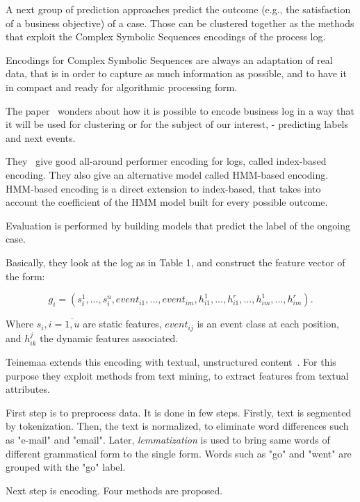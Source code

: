 A next group of prediction approaches predict the outcome (e.g., the satisfaction of a business objective) of a case. Those can be clustered together as the methods that exploit the Complex Symbolic Sequences encodings of the process log.

Encodings for Complex Symbolic Sequences are always an adaptation of real data, that is in order to capture as much information as possible, and to have it in compact and ready for algorithmic processing form. 

The paper~\cite{Leontjeva2015} wonders about how it is possible to encode business log in a way that it will be used for clustering or for the subject of our interest, - predicting labels and next events.

They~\cite{Leontjeva2015} give good all-around performer encoding for logs, called index-based encoding. They also give an alternative model called HMM-based encoding. HMM-based encoding is a direct extension to index-based, that takes into account the coefficient of the HMM model built for every possible outcome.

Evaluation is performed by building models that predict the label of the ongoing case.

Basically, they look at the log as in Table 1, and construct the feature vector of the form:

\[g_i = (s_i^1,...,s_i^u,event_{i1},...,event_{im},h_{i1}^1,...,h_{i1}^r,...,h_{im}^1,...,h_{im}^r).\]

Where $s_i, i=\overline{1,u}$ are static features, $event_{ij}$ is an event class at each position, and $h_{ik}^{j}$ the dynamic features associated. 

Teinemaa extends this encoding with textual, unstructured content~\cite{DBLP:conf/bpm/TeinemaaDMF16}. For this purpose they exploit methods from text mining, to extract features from textual attributes.

First step is to preprocess data. It is done in few steps. Firstly, text is segmented by tokenization. Then, the text is normalized, to eliminate word differences such as "e-mail" and "email". Later, \textit{lemmatization} is used to bring same words of different grammatical form to the single form. Words such as "go" and "went" are grouped with the "go" label.

Next step is encoding. Four methods are proposed.

